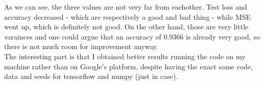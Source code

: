 \documentclass[11pt]{scrartcl}
\begin{document}
		As we can see, the three values are not very far from eachother. Test loss and accuracy decreased - which are respectively a good and bad thing - while MSE went up, which is definitely not good. On the other hand, those are very little varainces and one could argue that an accuracy of 0.9366 is already very good, so there is not much room for improvement anyway.\\

		The interesting part is that I obtained better results running the code on my machine rather than on Google's platform, despite having the exact same code, data and seeds for tensorflow and numpy (just in case).
\end{document}
